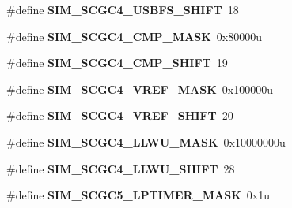 \begin{DoxyCompactItemize}
\item 
\hypertarget{group___s_i_m___register___masks_ga12840cc6f1ddb70fdb3f54ed759d5844}{}\#define {\bfseries S\+I\+M\+\_\+\+S\+C\+G\+C4\+\_\+\+U\+S\+B\+F\+S\+\_\+\+S\+H\+I\+F\+T}~18\label{group___s_i_m___register___masks_ga12840cc6f1ddb70fdb3f54ed759d5844}

\item 
\hypertarget{group___s_i_m___register___masks_gad7304bdb8fc46deb77c5e444e56fae40}{}\#define {\bfseries S\+I\+M\+\_\+\+S\+C\+G\+C4\+\_\+\+C\+M\+P\+\_\+\+M\+A\+S\+K}~0x80000u\label{group___s_i_m___register___masks_gad7304bdb8fc46deb77c5e444e56fae40}

\item 
\hypertarget{group___s_i_m___register___masks_ga1072a5419bbeaf4081c6c4a5ca7cf86c}{}\#define {\bfseries S\+I\+M\+\_\+\+S\+C\+G\+C4\+\_\+\+C\+M\+P\+\_\+\+S\+H\+I\+F\+T}~19\label{group___s_i_m___register___masks_ga1072a5419bbeaf4081c6c4a5ca7cf86c}

\item 
\hypertarget{group___s_i_m___register___masks_gab32de0f8a4b83a05b226638154da75c0}{}\#define {\bfseries S\+I\+M\+\_\+\+S\+C\+G\+C4\+\_\+\+V\+R\+E\+F\+\_\+\+M\+A\+S\+K}~0x100000u\label{group___s_i_m___register___masks_gab32de0f8a4b83a05b226638154da75c0}

\item 
\hypertarget{group___s_i_m___register___masks_ga7f6801c437e23853cffdf9807319ff87}{}\#define {\bfseries S\+I\+M\+\_\+\+S\+C\+G\+C4\+\_\+\+V\+R\+E\+F\+\_\+\+S\+H\+I\+F\+T}~20\label{group___s_i_m___register___masks_ga7f6801c437e23853cffdf9807319ff87}

\item 
\hypertarget{group___s_i_m___register___masks_ga8b6be9395a34e676572ed019fba259bd}{}\#define {\bfseries S\+I\+M\+\_\+\+S\+C\+G\+C4\+\_\+\+L\+L\+W\+U\+\_\+\+M\+A\+S\+K}~0x10000000u\label{group___s_i_m___register___masks_ga8b6be9395a34e676572ed019fba259bd}

\item 
\hypertarget{group___s_i_m___register___masks_ga37763000b56156827c51239c40115100}{}\#define {\bfseries S\+I\+M\+\_\+\+S\+C\+G\+C4\+\_\+\+L\+L\+W\+U\+\_\+\+S\+H\+I\+F\+T}~28\label{group___s_i_m___register___masks_ga37763000b56156827c51239c40115100}

\item 
\hypertarget{group___s_i_m___register___masks_ga52265aeecddf9a1d725645b5e27d7da7}{}\#define {\bfseries S\+I\+M\+\_\+\+S\+C\+G\+C5\+\_\+\+L\+P\+T\+I\+M\+E\+R\+\_\+\+M\+A\+S\+K}~0x1u\label{group___s_i_m___register___masks_ga52265aeecddf9a1d725645b5e27d7da7}


\end{DoxyCompactItemize}
